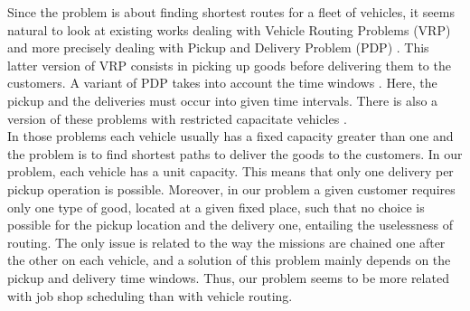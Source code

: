 \documentclass[a4paper,12pt]{article}
\begin{document}

Since the problem is about finding shortest routes for a fleet of vehicles, it seems natural to look at existing works dealing with Vehicle Routing Problems (VRP) \cite{Toth2001,Laporte1992} and more precisely dealing with Pickup and Delivery Problem (PDP) \cite{Berbeglia2007}. This latter version of VRP consists in picking up goods before delivering them to the customers. A variant of PDP takes into account the time windows \cite{Mitrovic1998}. Here, the pickup and the deliveries must occur into given time intervals. There is also a version of these problems with restricted capacitate vehicles \cite{Toth2001}. \\

In those problems each vehicle usually has a fixed capacity greater than one and the problem is to find shortest paths to deliver the goods to the customers. In our problem, each vehicle has a unit capacity. This means that only one delivery per pickup operation is possible. Moreover, in our problem a given customer requires only one type of good, located at a given fixed place, such that no choice is possible for the pickup location and the delivery one, entailing the uselessness of routing. The only issue is related to the way the missions are chained one after the other on each vehicle, and a solution of this problem mainly depends on the pickup and delivery time windows. Thus, our problem seems to be more related with job shop scheduling than with vehicle routing.\\



\end{document}
